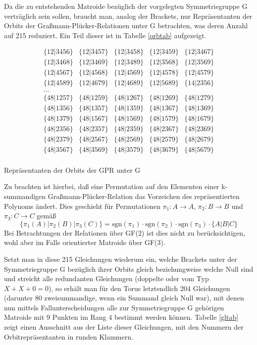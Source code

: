 Da die zu entstehenden Matroide bezüglich der vorgelegten Symmetriegruppe G
verträglich sein sollen, braucht man, analog der Brackets, nur Repräsentanten
der Orbits der Graßmann-Plücker-Relationen unter G betrachten, was deren
Anzahl auf 215 reduziert. Ein Teil dieser ist in Tabelle \ref{orbtab}
aufgezeigt.

\begin{table}[htb]
{\small
$$
\begin{array}{ccccc}
\{12|3456\} & \{12|3457\} & \{12|3458\} & \{12|3459\} & \{12|3467\} \\
\{12|3468\} & \{12|3469\} & \{12|3489\} & \{12|3568\} & \{12|3569\} \\
\{12|4567\} & \{12|4568\} & \{12|4569\} & \{12|4578\} & \{12|4579\} \\
\{12|4589\} & \{12|4679\} & \{12|4689\} & \{12|5689\} & \{14|2356\} \\
\ldots      &             &             &             &             \\
\{48|1257\} & \{48|1259\} & \{48|1267\} & \{48|1269\} & \{48|1279\} \\
\{48|1356\} & \{48|1357\} & \{48|1359\} & \{48|1367\} & \{48|1369\} \\
\{48|1379\} & \{48|1567\} & \{48|1569\} & \{48|1579\} & \{48|1679\} \\
\{48|2356\} & \{48|2357\} & \{48|2359\} & \{48|2367\} & \{48|2369\} \\
\{48|2379\} & \{48|2567\} & \{48|2569\} & \{48|2579\} & \{48|2679\} \\
\{48|3567\} & \{48|3569\} & \{48|3579\} & \{48|3679\} & \{48|5679\} \\
\end{array}$$}
\caption{Repräsentanten der Orbits der GPR unter G}
\label{orbtab}
\end{table}

Zu beachten ist hierbei, daß eine Permutation auf den Elementen einer
k-sum\-man\-di\-gen Graßmann-Plücker-Relation das Vorzeichen des
repräsentierten Polynoms ändert. Dies geschieht für Permutationen
$\pi_1:A\to A$, $\pi_2:B\to B$ und $\pi_3:C\to C$ gemäß
$$\{\pi_1(A)|\pi_2(B)|\pi_3(C)\} =
\mbox{sgn}(\pi_1)\cdot\mbox{sgn}(\pi_2)\cdot\mbox{sgn}(\pi_3)\cdot\{A|B|C\}$$
Bei Betrachtungen der Relationen über GF(2) ist dies nicht zu berücksichtigen,
wohl aber im Falle orientierter Matroide über GF(3).

Setzt man in diese 215 Gleichungen wiederum ein, welche Brackets unter der
Symmetriegruppe G bezüglich ihrer Orbits gleich beziehungweise welche Null
sind und streicht alle redundanten Gleichungen (doppelte oder vom Typ
$X + X + 0 = 0$), so erhält man für den Torus letztendlich 204 Gleichungen
(darunter 80 zweisummandige, wenn ein Summand gleich Null war), mit denen nun
mittels Fallunterscheidungen alle zur Symmetriegruppe G gehörigen Matroide
mit 9 Punkten im Rang 4 bestimmt werden können. Tabelle \ref{gltab} zeigt
einen Ausschnitt aus der Liste dieser Gleichungen, mit den Nummern der
Orbitrepräsentanten in runden Klammern.

